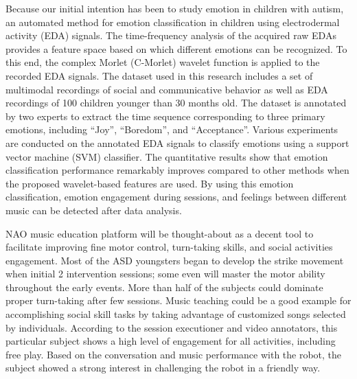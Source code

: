 {Because our initial intention has been to study emotion in children with autism, an automated method for emotion classification in children using electrodermal activity (EDA) signals. The time-frequency analysis of the acquired raw EDAs provides a feature space based on which different emotions can be recognized. To this end, the complex Morlet (C-Morlet) wavelet function is applied to the recorded EDA signals. The dataset used in this research includes a set of multimodal recordings of social and communicative behavior as well as EDA recordings of 100 children younger than 30 months old. The dataset is annotated by two experts to extract the time sequence corresponding to three primary emotions, including “Joy”, “Boredom”, and “Acceptance”. Various experiments are conducted on the annotated EDA signals to classify emotions using a support vector machine (SVM) classifier. The quantitative results show that emotion classification performance remarkably improves compared to other methods when the proposed wavelet-based features are used. By using this emotion classification, emotion engagement during sessions, and feelings between different music can be detected after data analysis.

NAO music education platform will be thought-about as a decent tool to facilitate improving fine motor control, turn-taking skills, and social activities engagement. Most of the ASD youngsters began to develop the strike movement when initial 2 intervention sessions; some even will master the motor ability throughout the early events. More than half of the subjects could dominate proper turn-taking after few sessions. Music teaching could be a good example for accomplishing social skill tasks by taking advantage of customized songs selected by individuals. According to the session executioner and video annotators, this particular subject shows a high level of engagement for all activities, including free play. Based on the conversation and music performance with the robot, the subject showed a strong interest in challenging the robot in a friendly way.\\

}
